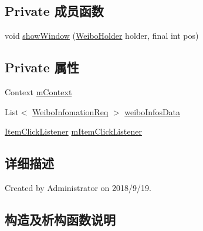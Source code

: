 \subsection*{Private 成员函数}
\begin{DoxyCompactItemize}
\item 
void \mbox{\hyperlink{classcom_1_1example_1_1akisame__lin_1_1love__air2_1_1adapter_1_1_weibo_adapter_a69dcddef0717935005adc570b393ebe7}{show\+Window}} (\mbox{\hyperlink{classcom_1_1example_1_1akisame__lin_1_1love__air2_1_1adapter_1_1_weibo_adapter_1_1_weibo_holder}{Weibo\+Holder}} holder, final int pos)
\end{DoxyCompactItemize}
\subsection*{Private 属性}
\begin{DoxyCompactItemize}
\item 
Context \mbox{\hyperlink{classcom_1_1example_1_1akisame__lin_1_1love__air2_1_1adapter_1_1_weibo_adapter_af416cea463fc1407b8fb459a9d59bcc4}{m\+Context}}
\item 
List$<$ \mbox{\hyperlink{classcom_1_1example_1_1akisame__lin_1_1love__air2_1_1bean1_1_1_weibo_infomation_req}{Weibo\+Infomation\+Req}} $>$ \mbox{\hyperlink{classcom_1_1example_1_1akisame__lin_1_1love__air2_1_1adapter_1_1_weibo_adapter_a065026a34dcf4c259c37e5c164922c2e}{weibo\+Infos\+Data}}
\item 
\mbox{\hyperlink{interfacecom_1_1example_1_1akisame__lin_1_1love__air2_1_1adapter_1_1_weibo_adapter_1_1_item_click_listener}{Item\+Click\+Listener}} \mbox{\hyperlink{classcom_1_1example_1_1akisame__lin_1_1love__air2_1_1adapter_1_1_weibo_adapter_a588a108d403507fe8c9f7dd1aa0a2b1c}{m\+Item\+Click\+Listener}}
\end{DoxyCompactItemize}


\subsection{详细描述}
Created by Administrator on 2018/9/19. 

\subsection{构造及析构函数说明}
\mbox{\label{classcom_1_1example_1_1akisame__lin_1_1love__air2_1_1adapter_1_1_weibo_adapter_a291062dd8e6d6a6651a3ea0fb93a04d7}} 
